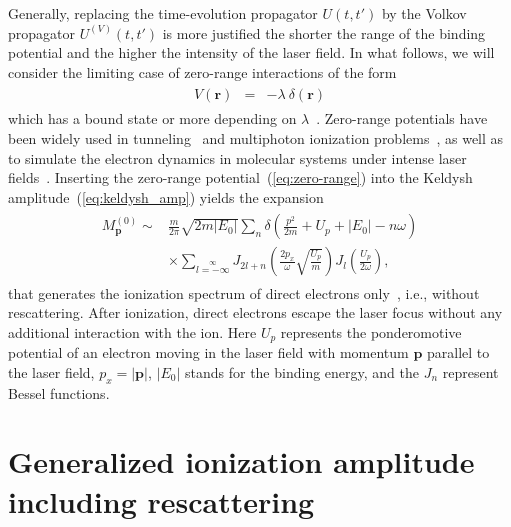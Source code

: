 Generally, replacing the time-evolution propagator $U(t,t')$ by the
Volkov propagator $U^{(V)}(t,t')$ is more justified the shorter the
range of the binding potential and the higher the intensity of the
laser field. In what follows, we will consider the limiting case of
zero-range interactions of the form
%
\begin{eqnarray}
\label{eq:zero-range}
\begin{split}
V(\mathbf{r}) & = & -\lambda\ \delta(\mathbf{r})
\end{split}
\end{eqnarray}
%
which has a bound state or more depending on
$\lambda$~\cite{Becker_rescattering1994, Becker_ati2002}. Zero-range
potentials have been widely used in tunneling~\cite{Kleber_zeroV1994}
and multiphoton ionization problems~\cite{Becker_zeroV1990}, as well
as to simulate the electron dynamics in molecular systems under
intense laser fields~\cite{frolov_zeroV2013}. Inserting the zero-range
potential~(\ref{eq:zero-range}) into the Keldysh
amplitude~(\ref{eq:keldysh_amp}) yields the expansion
%
\begin{eqnarray}
\label{eq:keldysh_amp_explicit}
\begin{split}
M_{\mathbf{p}}^{(0)} \sim &
\frac{m}{2\pi}\sqrt{2m|E_{0}|}
\sum\limits_{n} \delta\left(\frac{p^{2}}{2m} + U_{p} + |E_{0}| - n\omega\right) \\
& \times \sum\limits_{l=-\infty}\limits^{\infty} J_{2l+n}\left(\frac{2p_{x}}{\omega}
\sqrt{\frac{U_{p}}{m}} \right) J_{l}\left( \frac{U_{p}}{2\omega} \right),
\end{split}
\end{eqnarray}
%
that generates the ionization spectrum of direct electrons
only~\cite{Kopold_1997sfa}, i.e., without rescattering. After
ionization, direct electrons escape the laser focus without any
additional interaction with the ion. Here $U_{p}$ represents the
ponderomotive potential of an electron moving in the laser field with
momentum $\mathbf{p}$ parallel to the laser field, $p_{x} =
|\mathbf{p}|$, $|E_{0}|$ stands for the binding energy, and the
$J_{n}$ represent Bessel functions.


\section{\label{kopold_sfa} Generalized ionization amplitude including rescattering}

